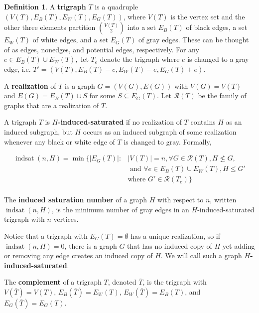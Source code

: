 \documentclass[12pt]{amsart}
\theoremstyle{plain}
\theoremstyle{definition}
\newtheorem{defn}[thm]{Definition}
\theoremstyle{remark}
\newcommand{\indsat}[2]{\ensuremath{\operatorname{indsat}(#1,#2)}\xspace}
\renewcommand{\bar}{\overline}
\begin{document}
\begin{defn}
A  \textbf{trigraph} $T$ is a quadruple $(V(T), E_B(T), E_W(T), E_G(T))$, where $V(T)$ is the vertex set and the other three elements partition ${V(T)\choose 2}$ into a set $E_B(T)$ of black edges, a set $E_W(T)$ of white edges, and a set $E_G(T)$ of gray edges.
These can be thought of as edges, nonedges, and potential edges, respectively. For any $e\in E_B(T)\cup E_W(T),$ let $T_e$ denote the trigraph where $e$ is changed to a gray edge, i.e. $T'=(V(T),E_B(T)-e,E_W(T)-e,E_G(T)+e)$.

A  \textbf{realization} of $T$ is a graph $G=(V(G),E(G))$ with $V(G)=V(T)$ and $E(G)=E_B(T)\cup S$ for some $S\subseteq E_G(T)$.  Let $\mathcal{R}(T)$ be the family of graphs that are a realization of $T$.

A trigraph $T$ is \textbf{$H$-induced-saturated} if no realization of $T$ contains $H$ as an induced subgraph, but $H$ occurs as an induced subgraph of some realization whenever any black or white edge of $T$ is changed to gray. Formally,

\begin{align*}
\indsat{n}{H}=\min\{|E_G(T)|:&|V(T)|=n, \forall G\in \mathcal{R}(T), H\not\leq G,\\
&\text{~and~}\forall e\in E_B(T)\cup E_W(T), H\leq G' \\
&\text{where~} G'\in\mathcal{R}(T_e)\}\\
\end{align*}


The \textbf{induced saturation number} of a graph %
$H$ with respect to $n$, written $\indsat{n}{H}$, is the minimum number of gray edges in an $H$-induced-saturated trigraph with $n$ vertices.

Notice that a trigraph with $E_G(T)=\emptyset$ has a unique realization, so if $\indsat{n}{H}=0$, there is a graph $G$ that has no induced copy of $H$ yet adding or removing any edge creates an induced copy of $H$. We will call such a graph \textbf{$H$-induced-saturated}.

The {\bf complement} of a trigraph $T$, denoted $\overline{T}$, is the trigraph with $V(\bar T)=V(T)$, $E_B(\overline{T}) = E_W(T)$, $E_W(\overline{T}) = E_B(T)$, and $E_G(\bar T)=E_G(T)$.
\end{defn}
\end{document}
